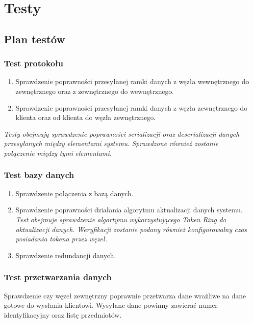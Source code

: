 \chapter{Testy}

\section{Plan testów}


\subsection*[Test protokołu]{Test protokołu}
\begin{enumerate}
\item Sprawdzenie poprawności przesyłanej ramki danych z węzła wewnętrznego do zewnętrznego oraz z zewnętrznego do wewnętrznego.
\item Sprawdzenie poprawności przesyłanej ramki danych z węzła zewnętrznego do klienta oraz od klienta do węzła zewnętrznego.
\end{enumerate}
	
\textit{Testy obejmują sprawdzenie poprawności serializacji oraz deserializacji danych przesyłanych między elementami systemu. Sprawdzone również zostanie połączenie między tymi elementami.}

\subsection*[Test bazy danych]{Test bazy danych}
\begin{enumerate}
\item Sprawdzenie połączenia z bazą danych.
\item Sprawdzenie poprawności działania algorytmu aktualizacji danych systemu. \\
\textit{Test obejmuje sprawdzenie algortymu wykorzystującego Token Ring do aktualizacji danych. Weryfikacji zostanie podany również konfigurowalny czas posiadania tokena przez węzeł.}
\item Sprawdzenie redundancji danych.

\end{enumerate}

\subsection*[Test przetwarzania danych]{Test przetwarzania danych}
Sprawdzenie czy węzeł zewnętrzny poprawnie przetwarza dane wrażliwe na dane gotowe do wysłania klientowi. Wysyłane dane powinny zawierać numer identyfikacyjny oraz listę przedmiotów.

